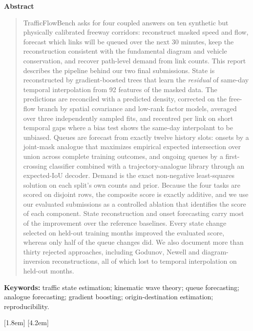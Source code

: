 \thispagestyle{plain}
\begin{center}
{\large\bfseries Abstract}
\end{center}
\begin{quotation}
\noindent TrafficFlowBench asks for four coupled answers on ten synthetic but physically calibrated freeway corridors:
reconstruct masked speed and flow, forecast which links will be queued over the next 30 minutes, keep the
reconstruction consistent with the fundamental diagram and vehicle conservation, and recover path-level demand
from link counts. This report describes the pipeline behind our two final submissions. State is reconstructed by
gradient-boosted trees that learn the \emph{residual} of same-day temporal interpolation from 92 features of the
masked data. The predictions are reconciled with a predicted density, corrected on the free-flow branch by spatial
covariance and low-rank factor models, averaged over three independently sampled fits, and recentred per link on
short temporal gaps where a bias test shows the same-day interpolant to be unbiased. Queues are forecast from exactly
twelve history slots: onsets by a joint-mask analogue that maximizes empirical expected intersection over union across
complete training outcomes, and ongoing queues by a first-crossing classifier combined with a trajectory-analogue
library through an expected-IoU decoder. Demand is the exact non-negative least-squares solution on each split's own
counts and prior. Because the four tasks are scored on disjoint rows, the composite score is exactly additive, and we
use our evaluated submissions as a controlled ablation that identifies the score of each component. State
reconstruction and onset forecasting carry most of the improvement over the reference baselines. Every state change
selected on held-out training months improved the evaluated score, whereas only half of the queue changes did. We
also document more than thirty rejected approaches, including Godunov, Newell and diagram-inversion reconstructions,
all of which lost to temporal interpolation on held-out months.
\end{quotation}

\vspace{2mm}
\noindent\textbf{Keywords:} traffic state estimation; kinematic wave theory; queue forecasting; analogue forecasting;
gradient boosting; origin-destination estimation; reproducibility.

\newpage
{\setcounter{tocdepth}{2}
[1.8em]{\addvspace{5pt}\bfseries}{\contentslabel{1.8em}}{}{\hfill\contentspage}
[4.2em]{}{\contentslabel{2.4em}}{}{\contentspage}
\tableofcontents}
\newpage
